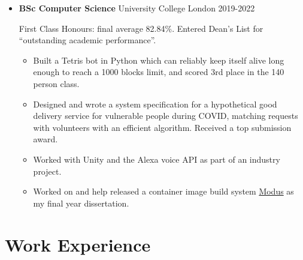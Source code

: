   \begin{itemize}
    \item \textbf{BSc Computer Science} \dashdiv{} University College London \dashdiv{} 2019-2022

      First Class Honours: final average 82.84\%. Entered Dean's List for ``outstanding academic performance''.

      \begin{itemize}
        \item Built a Tetris bot in Python which can reliably keep itself alive long enough to reach a 1000 blocks limit, and scored 3rd place in the 140 person class.

        \item Designed and wrote a system specification for a hypothetical good delivery service for vulnerable people during COVID, matching requests with volunteers with an efficient algorithm. Received a top submission award.

        \item Worked with Unity and the Alexa voice API as part of an industry project.

        \item Worked on and help released a container image build system \href{https://modus-continens.com/}{\color{link}Modus} as my final year dissertation.
      \end{itemize}


  \end{itemize}

  \section{Work Experience}

